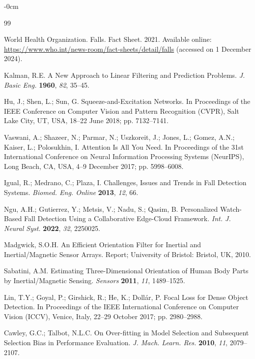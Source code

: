 \documentclass[journal,article,submit,pdftex,moreauthors]{../Definitions/mdpi}
\begin{document}
\begin{adjustwidth}{-\extralength}{0cm}

\begin{thebibliography}{99}

World Health Organization. Falls. Fact Sheet. 2021. Available online: \url{https://www.who.int/news-room/fact-sheets/detail/falls} (accessed on 1 December 2024).

Kalman, R.E. A New Approach to Linear Filtering and Prediction Problems. \textit{J. Basic Eng.} \textbf{1960}, \textit{82}, 35--45.

Hu, J.; Shen, L.; Sun, G. Squeeze-and-Excitation Networks. In Proceedings of the IEEE Conference on Computer Vision and Pattern Recognition (CVPR), Salt Lake City, UT, USA, 18--22 June 2018; pp. 7132--7141.

Vaswani, A.; Shazeer, N.; Parmar, N.; Uszkoreit, J.; Jones, L.; Gomez, A.N.; Kaiser, L.; Polosukhin, I. Attention Is All You Need. In Proceedings of the 31st International Conference on Neural Information Processing Systems (NeurIPS), Long Beach, CA, USA, 4--9 December 2017; pp. 5998--6008.

Igual, R.; Medrano, C.; Plaza, I. Challenges, Issues and Trends in Fall Detection Systems. \textit{Biomed. Eng. Online} \textbf{2013}, \textit{12}, 66.

Ngu, A.H.; Gutierrez, Y.; Metsis, V.; Nadu, S.; Qasim, B. Personalized Watch-Based Fall Detection Using a Collaborative Edge-Cloud Framework. \textit{Int. J. Neural Syst.} \textbf{2022}, \textit{32}, 2250025.

Madgwick, S.O.H. An Efficient Orientation Filter for Inertial and Inertial/Magnetic Sensor Arrays. Report; University of Bristol: Bristol, UK, 2010.

Sabatini, A.M. Estimating Three-Dimensional Orientation of Human Body Parts by Inertial/Magnetic Sensing. \textit{Sensors} \textbf{2011}, \textit{11}, 1489--1525.

Lin, T.Y.; Goyal, P.; Girshick, R.; He, K.; Doll\'{a}r, P. Focal Loss for Dense Object Detection. In Proceedings of the IEEE International Conference on Computer Vision (ICCV), Venice, Italy, 22--29 October 2017; pp. 2980--2988.

Cawley, G.C.; Talbot, N.L.C. On Over-fitting in Model Selection and Subsequent Selection Bias in Performance Evaluation. \textit{J. Mach. Learn. Res.} \textbf{2010}, \textit{11}, 2079--2107.

\end{thebibliography}

\end{adjustwidth}
\end{document}
